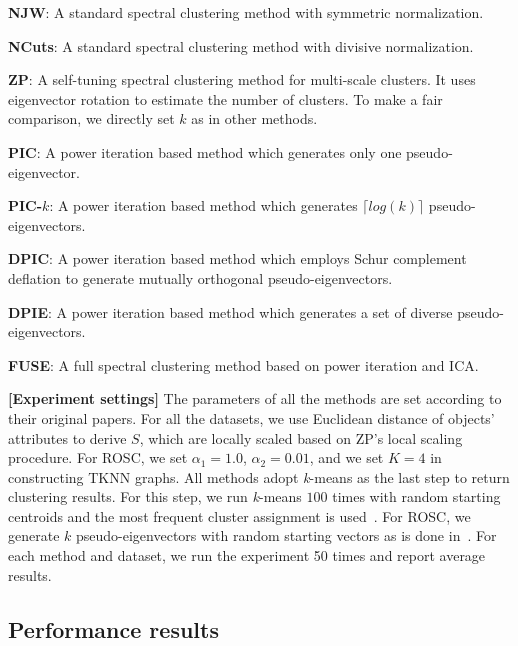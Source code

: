 \noindent{\small$\bullet$}
\textbf{NJW}: A standard spectral clustering method with symmetric normalization.

\noindent{\small$\bullet$}
\textbf{NCuts}: A standard spectral clustering method with divisive normalization.

\noindent{\small$\bullet$}
\textbf{ZP}: A self-tuning spectral clustering method for multi-scale clusters.
It uses eigenvector rotation to estimate the number of clusters.
To make a fair comparison, we directly set $k$ as in other methods.

\noindent{\small$\bullet$}
\textbf{PIC}: A power iteration based method which generates only one pseudo-eigenvector.

\noindent{\small$\bullet$}
\textbf{PIC-$k$}:
A power iteration based method which generates $\lceil log(k)\rceil$ pseudo-eigenvectors.

\noindent{\small$\bullet$}
\textbf{DPIC}: 
A power iteration based method which employs Schur complement deflation to generate mutually orthogonal pseudo-eigenvectors.

\noindent{\small$\bullet$}
\textbf{DPIE}: A power iteration based method which generates a set of diverse pseudo-eigenvectors.

\noindent{\small$\bullet$}
\textbf{FUSE}:
A full spectral clustering method based on power iteration and ICA. 


\textbf{[Experiment settings]} The parameters of all the methods are set according to their original papers.
For all the datasets,
we use Euclidean distance of objects' attributes to derive $S$,
which are locally scaled based on ZP's local scaling procedure.
For ROSC, we set $\alpha_1 = 1.0$, $\alpha_2 = 0.01$, and we set $K=4$ in constructing TKNN graphs. 
All methods adopt \emph{k}-means as the last step to return clustering results.
For this step, 
we run \emph{k}-means $100$ times with random starting centroids
and the most frequent cluster assignment is used~\cite{lin2010power}.
For ROSC, we generate $k$ pseudo-eigenvectors with random starting vectors as is done in~\cite{thang2013deflation}.
For each method and dataset,
we run the experiment 50 times and report average results.

\subsection{Performance results}
\label{sec:results}

